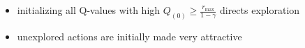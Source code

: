 \begin{frame}
\begin{enumerate}
{	\begin{itemize}
		\item initializing all Q-values with high 
			$Q_{(0)} \geq \frac{r_\text{max}}{1-\gamma}$ directs exploration
		\vspace{1mm}
		\item unexplored actions are initially made very attractive
		
		\\
		
	\end{itemize}
	}


\end{enumerate}

\end{frame}

